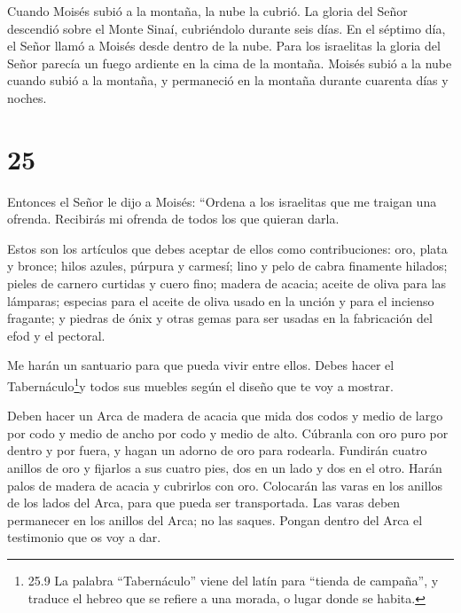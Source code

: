  Cuando Moisés subió a la montaña, la nube la cubrió.
 La gloria del Señor descendió sobre el Monte Sinaí,
cubriéndolo durante seis días. En el séptimo día, el Señor llamó a
Moisés desde dentro de la nube.  Para los israelitas la
gloria del Señor parecía un fuego ardiente en la cima de la montaña.
 Moisés subió a la nube cuando subió a la montaña, y
permaneció en la montaña durante cuarenta días y noches.

\hypertarget{section-24}{%
\section{25}\label{section-24}}

 Entonces el Señor le dijo a Moisés:  ``Ordena a
los israelitas que me traigan una ofrenda. Recibirás mi ofrenda de todos
los que quieran darla.

 Estos son los artículos que debes aceptar de ellos como
contribuciones: oro, plata y bronce;  hilos azules, púrpura
y carmesí; lino y pelo de cabra finamente hilados;  pieles
de carnero curtidas y cuero fino; madera de acacia;  aceite
de oliva para las lámparas; especias para el aceite de oliva usado en la
unción y para el incienso fragante;  y piedras de ónix y
otras gemas para ser usadas en la fabricación del efod y el pectoral.

 Me harán un santuario para que pueda vivir entre ellos.
 Debes hacer el Tabernáculo\footnote{25.9 La palabra
  ``Tabernáculo'' viene del latín para ``tienda de campaña'', y traduce
  el hebreo que se refiere a una morada, o lugar donde se habita.}y
todos sus muebles según el diseño que te voy a mostrar.

 Deben hacer un Arca de madera de acacia que mida dos codos
y medio de largo por codo y medio de ancho por codo y medio de alto.
 Cúbranla con oro puro por dentro y por fuera, y hagan un
adorno de oro para rodearla.  Fundirán cuatro anillos de
oro y fijarlos a sus cuatro pies, dos en un lado y dos en el otro.
 Harán palos de madera de acacia y cubrirlos con oro.
 Colocarán las varas en los anillos de los lados del Arca,
para que pueda ser transportada.  Las varas deben
permanecer en los anillos del Arca; no las saques.  Pongan
dentro del Arca el testimonio que os voy a dar.

